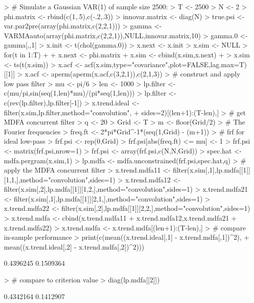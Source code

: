 \documentclass[a4paper]{book}
\begin{document}
\begin{Schunk}
\begin{Sinput}
> # Simulate a Gaussian VAR(1) of sample size 2500:
> T <- 2500
> N <- 2
> phi.matrix <- rbind(c(1,.5),c(-.2,.3))
> innovar.matrix <- diag(N)
> true.psi <- var.par2pre(array(phi.matrix,c(2,2,1)))
> gamma <- VARMAauto(array(phi.matrix,c(2,2,1)),NULL,innovar.matrix,10)
> gamma.0 <- gamma[,,1]
> x.init <- t(chol(gamma.0)) %
> x.next <- x.init
> x.sim <- NULL
> for(t in 1:T)
+ {
+ 	x.next <- phi.matrix %
+ 	x.sim <- cbind(x.sim,x.next)
+ }
> x.sim <- ts(t(x.sim))
> x.acf <- acf(x.sim,type="covariance",plot=FALSE,lag.max=T)[[1]]
> x.acf <- aperm(aperm(x.acf,c(3,2,1)),c(2,1,3))
> # construct and apply low pass filter
> mu <- pi/6
> len <- 1000
> lp.filter <- c(mu/pi,sin(seq(1,len)*mu)/(pi*seq(1,len)))
> lp.filter <- c(rev(lp.filter),lp.filter[-1])
> x.trend.ideal <- filter(x.sim,lp.filter,method="convolution",
+                         sides=2)[(len+1):(T-len),]
> # get MDFA concurrent filter
> q <- 20
> Grid <- T
> m <- floor(Grid/2)
> # The Fourier frequencies
> freq.ft <- 2*pi*Grid^{-1}*(seq(1,Grid) - (m+1))
> # frf for ideal low-pass
> frf.psi <- rep(0,Grid)
> frf.psi[abs(freq.ft) <= mu] <- 1
> frf.psi <- matrix(frf.psi,nrow=1) %
> frf.psi <- array(frf.psi,c(N,N,Grid))
> spec.hat <- mdfa.pergram(x.sim,1)	
> lp.mdfa <- mdfa.unconstrained(frf.psi,spec.hat,q)
> # apply the MDFA concurrent filter
> x.trend.mdfa11 <- filter(x.sim[,1],lp.mdfa[[1]][1,1,],method="convolution",sides=1)
> x.trend.mdfa12 <- filter(x.sim[,2],lp.mdfa[[1]][1,2,],method="convolution",sides=1)
> x.trend.mdfa21 <- filter(x.sim[,1],lp.mdfa[[1]][2,1,],method="convolution",sides=1)
> x.trend.mdfa22 <- filter(x.sim[,2],lp.mdfa[[1]][2,2,],method="convolution",sides=1)
> x.trend.mdfa <- cbind(x.trend.mdfa11 + x.trend.mdfa12,x.trend.mdfa21 + x.trend.mdfa22)
> x.trend.mdfa <- x.trend.mdfa[(len+1):(T-len),] 
> # compare in-sample performance
> print(c(mean((x.trend.ideal[,1] - x.trend.mdfa[,1])^2),
+ 	mean((x.trend.ideal[,2] - x.trend.mdfa[,2])^2)))
\end{Sinput}
\begin{Soutput}
[1] 0.4396245 0.1509364
\end{Soutput}
\begin{Sinput}
> # compare to criterion value
> diag(lp.mdfa[[2]])
\end{Sinput}
\begin{Soutput}
[1] 0.4342164 0.1412907
\end{Soutput}
\end{Schunk}
\end{document}
